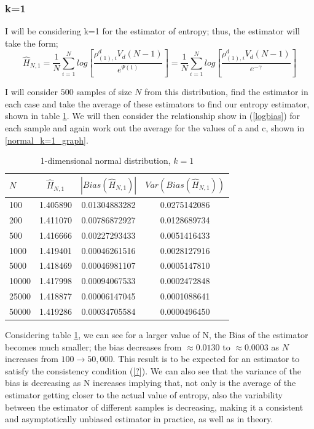 \documentclass{article}
\begin{document}
\subsubsection{k=1} \label{N_k=1}
I will be considering k=1 for the estimator of entropy; thus, the estimator will take the form;
\begin{equation} 
\hat{H}_{N, 1} = \frac{1}{N} \sum_{i=1}^{N} log \left[ \frac{\rho_{(1),i}^{d} V_{d} (N-1)}{e^{\Psi(1)}} \right] = \frac{1}{N} \sum_{i=1}^{N} log \left[ \frac{\rho_{(1),i}^{d} V_{d} (N-1)}{e^{-\gamma}} \right] \nonumber
\end{equation}

I will consider $500$ samples of size $N$ from this distribution, find the estimator in each case and take the average of these estimators to find our entropy estimator, shown in table \ref{normal_k=1_table}. We will then consider the relationship show in (\ref{logbias}) for each sample and again work out the average for the values of a and c, shown in \ref{normal_k=1_graph}.

\begin{table}
\caption{1-dimensional normal distribution, $k=1$} \label{normal_k=1_table}
\begin{center}
\begin{tabular}{| l | c c c|} 
\toprule
$N$ & $\hat{H}_{N, 1}$ & $|Bias(\hat{H}_{N, 1})|$ & $Var(Bias(\hat{H}_{N, 1}))$ \\
\midrule[1pt]
100     & 1.405890     & 0.01304883282     & 0.0275142086  \\
200     & 1.411070     & 0.00786872927     & 0.0128689734  \\
500     & 1.416666     & 0.00227293433     & 0.0051416433  \\
1000    & 1.419401     & 0.00046261516     & 0.0028127916  \\
5000    & 1.418469     & 0.00046981107     & 0.0005147810  \\
10000   & 1.417998     & 0.00094067533     & 0.0002472848  \\
25000   & 1.418877     & 0.00006147045     & 0.0001088641  \\
50000   & 1.419286     & 0.00034705584     & 0.0000496450  \\
\hline
\end{tabular}
\end{center}
\end{table}

Considering table \ref{normal_k=1_table}, we can see for a larger value of N, the Bias of the estimator becomes much smaller; the bias decreases from $\approx 0.0130$ to $\approx 0.0003$ as $N$ increases from $100 \to 50,000$. This result is to be expected for an estimator to satisfy the consistency condition (\ref{?}). We can also see that the variance of the bias is decreasing as N increases implying that, not only is the average of the estimator getting closer to the actual value of entropy, also the variability between the estimator of different samples is decreasing, making it a consistent and asymptotically unbiased estimator in practice, as well as in theory.
\end{document}
